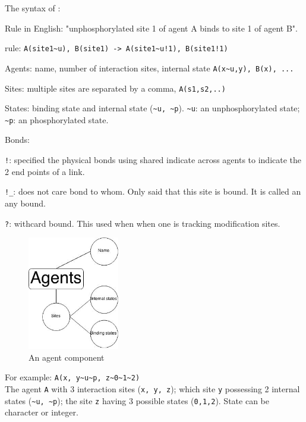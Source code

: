 \documentclass{article}
\begin{document}
The syntax of \kapa:

\begin{framed}
\begin{i}
\item Rule in English: "unphosphorylated site 1 of agent A binds to site 1 of
agent B".
\item \kapa rule: \verb|A(site1~u), B(site1) -> A(site1~u!1), B(site1!1)|
\end{i}
\end{framed}

\begin{i}
\item Agents: name, number of interaction sites, internal state
  \verb|A(x~u,y), B(x), ...|
\item Sites: multiple sites are separated by a comma, \verb|A(s1,s2,..)|
\item States: binding state and internal state (\verb|~u, ~p|). \verb|~u|:
  an unphosphorylated state; \verb|~p|: an phosphorylated state.
\item Bonds:
\begin{i}
\item \verb|!|: specified the physical bonds using shared indicate across
  agents to indicate the 2 end points of a link.
\item \verb|!_|: does not care bond to whom. Only said that this site is
  bound. It is called an any bound.
\item \verb|?|: withcard bound. This used when when one is tracking
  modification sites.
\end{i}
\end{i}

\begin{figure}[ht!]
\centering
\includegraphics[width=40mm]{agents.jpg}
\caption{An agent component \label{agent}}
\end{figure}

For example: \verb|A(x, y~u~p, z~0~1~2)|\\

The agent \verb|A| with 3 interaction sites (\verb|x, y, z|); which site
\verb|y| possessing 2 internal states (\verb|~u, ~p|); the site \verb|z|
having 3 possible states (\verb|0,1,2|). State can be character or integer.
\end{document}
